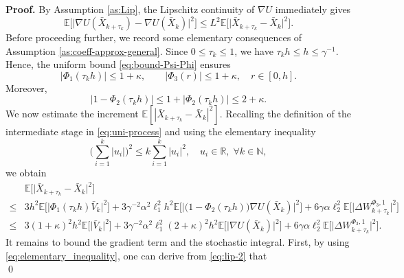 \documentclass[12pt]{article}
\numberwithin{equation}{section}
\renewenvironment{proof}%
  {\begin{trivlist}%
   \item[]\ignorespaces}%
  {\qed\end{trivlist}}
\newcommand{\R}{\mathbb{R}}
\newcommand{\E}{\mathbb{E}}
\begin{document}
\begin{proof}
\textbf{Proof.}
By Assumption \ref{as:Lip}, the Lipschitz continuity of $\nabla U$ immediately gives
\begin{equation}
\label{eq:grad-lip-intermediate}
\mathbb{E}
\big[\big|
\nabla U
(\bar{X}_{k+\tau_k})
-
\nabla U  
(\bar{X}_{k})
\big|^2\big] 
\leq
L^2\mathbb{E}
\big[\big|
\bar{X}_{k+\tau_k}
-
\bar{X}_k
\big|^2\big] .
\end{equation}
Before proceeding further,
we record some elementary consequences of Assumption \ref{as:coeff-approx-general}. Since  $0\leq\tau_k\leq1$,
we have $\tau_kh\leq h \leq \gamma^{-1}$. Hence, the uniform bound \eqref{eq:bound-Psi-Phi} ensures
\[
|\Phi_1(\tau_kh)|
\leq
1+\kappa,
\qquad
|\Phi_3(r)|\leq
1+\kappa,
\quad  
r \in [0,h].
\]
Moreover,
\[|1-\Phi_2(\tau_kh)|
\leq
1+|\Phi_2(\tau_kh)|
\leq
2+\kappa.\]
We now estimate the increment $\E [|\bar{X}_{k+\tau_k}-\bar{X}_k|^2]$. Recalling the definition of the intermediate stage in \eqref{eq:uni-process} and using the elementary inequality
\begin{equation}
\label{eq:elementary_inequality}
\Big(
\sum_{i=1}^{k}|u_i|
\Big)^2 
\leq 
k
\sum_{i=1}^{k}|u_i|^2, 
\quad
u_i \in \R, \; 
\forall k \in \mathbb{N},
\end{equation}
we obtain
\begin{equation}
\label{eq:increment-split}
\begin{aligned}
&  \mathbb{E}
\Big[\big|
\bar{X}_{k+\tau_k}
-
\bar{X}_k
\big|^2\Big] 
\\
\leq     &
3 
h^2
\mathbb{E}
\Big[\big| 
\Phi_1(\tau_kh)
\bar{V}_k
\big|^2\Big]
+
3
\gamma^{-2}
\alpha^2
\ell_1^2 h^2
\mathbb{E}
\Big[\big|
\big(1-\Phi_2(\tau_kh)\big)
\nabla U(\bar{X}_k)
\big|^2\Big]   
+ 
6\gamma
\alpha
\ell_2^2
\mathbb{E}
\Big[\big|
\Delta W_{k+\tau_k}^{\Phi_3,1}
\big|^2\Big]
\\  
\leq    &
3 
(1 +  \kappa)^2
h^2
\mathbb{E}
\Big[\big|
\bar{V}_k
\big|^2\Big] 
+
3 
\gamma^{-2}
\alpha^2
\ell_1^2
(2 +  \kappa)^2
h^2
\mathbb{E}
\Big[\big|
\nabla U(\bar{X}_k)
\big|^2\Big] 
+ 
6\gamma
\alpha
\ell_2^2
\mathbb{E}
\Big[\big|
\Delta W_{k+\tau_k}^{\Phi_3,1}
\big|^2\Big].
\end{aligned}
\end{equation}
It remains to bound the gradient term and the stochastic integral. First, by using \eqref{eq:elementary_inequality}, one can derive from  \eqref{eq:lip-2}  that 
\begin{equation}\label{eq:gradient-growth-square}

\end{equation}
\end{proof}
\end{document}
